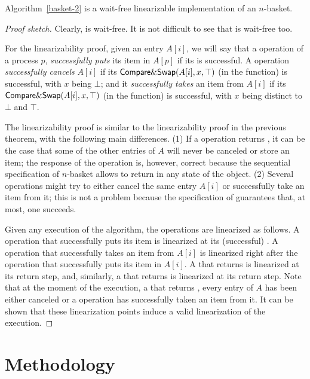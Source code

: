 \begin{theorem}
Algorithm~\ref{basket-2} is a wait-free linearizable implementation of an $n$-basket.
\end{theorem}

\begin{proof}[Proof sketch]
Clearly, \Put is wait-free. It is not difficult to see that \Take is wait-free too.

For the linearizability proof, given an entry $A[i]$, we will say that a \Put operation of a process $p$, \emph{successfully puts} its item in $A[p]$ if its \CAS is successful.  A \Take operation \emph{successfully cancels} $A[i]$ if its ${\sf \small Compare\&Swap}(A[i], x, \top)$ (in the \compete function) is successful, with $x$ being $\bot$; and it \emph{successfully takes} an item from $A[i]$ if its ${\sf \small Compare\&Swap}(A[i], x, \top)$ (in the \compete function) is successful, with $x$ being distinct to $\bot$ and $\top$.

The linearizability proof is similar to the linearizability proof in the previous theorem, with the following main differences.  (1) If a \Put operation returns \full, it can be the case that some of the other entries of $A$ will never be canceled or store an item; the response of the \Put operation is, however, correct because the sequential specification of $n$-basket allows \Put to return \full in any state of the object.  (2) Several \Take operations might try to either cancel the same entry $A[i]$ or successfully take an item from it; this is not a problem because the specification of \CAS guarantees that, at most, one succeeds.

Given any execution of the algorithm, the operations are linearized as follows.  A \Put operation that successfully puts its item is linearized at its (successful) \CAS.  A \Take operation that successfully takes an item from $A[i]$ is linearized right after the \Put operation that successfully puts its item in $A[i]$.  A \Put that returns \full is linearized at its return step, and, similarly, a \Take that returns \closed is linearized at its return step.  Note that at the moment of the execution, a \Take that returns \closed, every entry of $A$ has been either canceled or a \Take operation has successfully taken an item from it.  It can be shown that these linearization points induce a valid linearization of the execution.
\end{proof}

\section{Methodology}

